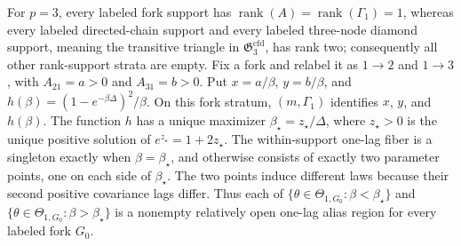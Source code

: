 For \(p=3\), every labeled fork support has \(\operatorname{rank}(A)=\operatorname{rank}(\Gamma_1)=1\), whereas every labeled directed-chain support and every labeled three-node diamond support, meaning the transitive triangle in \(\mathfrak G_3^{\mathrm{cfd}}\), has rank two; consequently all other rank-support strata are empty.  Fix a fork and relabel it as \(1\to2\) and \(1\to3\), with \(A_{21}=a>0\) and \(A_{31}=b>0\).  Put \(x=a/\beta\), \(y=b/\beta\), and \(h(\beta)=(1-e^{-\beta\Delta})^2/\beta\).  On this fork stratum, \((m,\Gamma_1)\) identifies \(x\), \(y\), and \(h(\beta)\).  The function \(h\) has a unique maximizer \(\beta_\star=z_\star/\Delta\), where \(z_\star>0\) is the unique positive solution of \(e^{z_\star}=1+2z_\star\).  The within-support one-lag fiber is a singleton exactly when \(\beta=\beta_\star\), and otherwise consists of exactly two parameter points, one on each side of \(\beta_\star\).  The two points induce different laws because their second positive covariance lags differ.  Thus each of \(\{\theta\in\Theta_{1,G_0}:\beta<\beta_\star\}\) and \(\{\theta\in\Theta_{1,G_0}:\beta>\beta_\star\}\) is a nonempty relatively open one-lag alias region for every labeled fork \(G_0\).